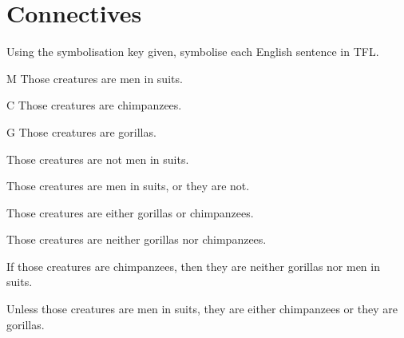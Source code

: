 \setcounter{chapter}{4}
\chapter{Connectives}\setcounter{ProbPart}{0}
\problempart Using the symbolisation key given, symbolise each English sentence in TFL.\label{pr.monkeysuits}
	\begin{ekey}
		\item[M] Those creatures are men in suits. 
		\item[C] Those creatures are chimpanzees. 
		\item[G] Those creatures are gorillas.
	\end{ekey}
\begin{earg}
\item Those creatures are not men in suits.
\item[] 
\item Those creatures are men in suits, or they are not.
\item[]  
\item Those creatures are either gorillas or chimpanzees.
\item[] 
\item Those creatures are neither gorillas nor chimpanzees.
\item[] 
\item If those creatures are chimpanzees, then they are neither gorillas nor men in suits.
\item[] 
\item Unless those creatures are men in suits, they are either chimpanzees or they are gorillas.
\item[] 
\end{earg}

